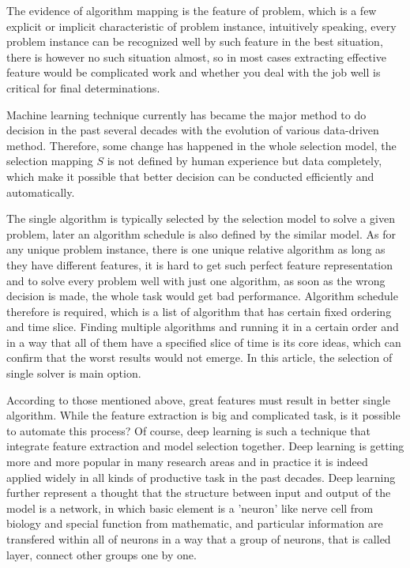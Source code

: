 \documentclass{article}
\begin{document}
    The evidence of algorithm mapping is the feature of problem, which is a few explicit or implicit characteristic of problem instance, intuitively speaking, every problem instance can be recognized well by such feature in the best situation, there is however no such situation almost, so in most cases extracting effective feature would be complicated work and whether you deal with the job well is critical for final determinations.
    
    Machine learning technique currently has became the major method to do decision in the past several decades with the evolution of various data-driven method. Therefore, some change has happened in the whole selection model, the selection mapping $S$ is not defined by human experience but data completely, which make it possible that better decision can be conducted efficiently and automatically.
    
    The single algorithm is typically selected by the selection model to solve a given problem, later an algorithm schedule is also defined by the similar model. As for any unique problem instance, there is one unique relative algorithm as long as they have different features, it is hard to get such perfect feature representation and to solve every problem well with just one algorithm, as soon as the wrong decision is made, the whole task would get bad performance. Algorithm schedule therefore is required, which is a list of algorithm that has certain fixed ordering and time slice. Finding multiple algorithms and running it in a certain order and in a way that all of them have a specified slice of time is its core ideas, which can confirm that the worst results would not emerge. In this article, the selection of single solver is main option.
    
    According to those mentioned above, great features must result in better single algorithm. While the feature extraction is big and complicated task, is it possible to automate this process? Of course, deep learning is such a technique that integrate feature extraction and model selection together. Deep learning is getting more and more popular in many research areas and in practice it is indeed applied widely in all kinds of productive task in the past decades. Deep learning further represent a thought that the structure between input and output of the model is a network, in which basic element is a 'neuron' like nerve cell from biology and special function from mathematic, and particular information are transfered within all of neurons in a way that a group of neurons, that is called layer, connect other groups one by one. 
    
\end{document}
